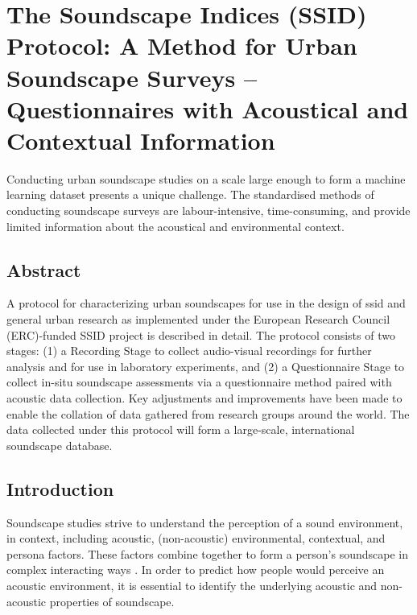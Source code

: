 \chapter[The SSID Protocol]{The Soundscape Indices (SSID) Protocol: A Method for Urban Soundscape Surveys -- Questionnaires with Acoustical and Contextual Information}


Conducting urban soundscape studies on a scale large enough to form a machine learning dataset presents a unique challenge. The standardised methods of conducting soundscape surveys \citep{ISO12913_2_2018IOS} are labour-intensive, time-consuming, and provide limited information about the acoustical and environmental context.

\section*{Abstract}

 A protocol for characterizing urban soundscapes for use in the design of \gls{ssid} and general urban research as implemented under the European Research Council (ERC)-funded SSID project is described in detail. The protocol consists of two stages: (1) a Recording Stage to collect audio-visual recordings for further analysis and for use in laboratory experiments, and (2) a Questionnaire Stage to collect in-situ soundscape assessments via a questionnaire method paired with acoustic data collection. Key adjustments and improvements have been made to enable the collation of data gathered from research groups around the world. The data collected under this protocol will form a large-scale, international soundscape database.

\section{Introduction}


 Soundscape studies strive to understand the perception of a sound environment, in context, including acoustic, (non-acoustic) environmental, contextual, and persona factors. These factors combine together to form a person's soundscape in complex interacting ways . In order to predict how people would perceive an acoustic environment, it is essential to identify the underlying acoustic and non-acoustic properties of soundscape.

